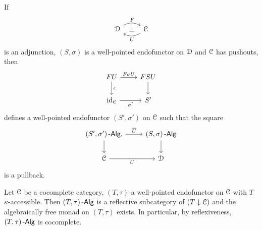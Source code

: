 \documentclass[a4paper,11pt,oneside,openany]{scrbook}
\begin{document}
\begin{prop}
	If
	\begin{displaymath}
		\begin{tikzcd}
			\D \arrow[r, "F", shift left=.1em, bend left=30]
			\arrow[from=r, "U", shift left=.1em, bend left=30]
			\arrow[r, phantom, "\bot"]
			& \C
		\end{tikzcd}
	\end{displaymath}
	is an adjunction, $ (S,\sigma) $ is a well-pointed endofunctor on $ \operatorname{\mathcal{D}} $
	and $ \operatorname{\mathcal{C}} $ has pushouts, then
	\begin{displaymath}
		\begin{tikzcd}
			FU \arrow[r,"F\sigma U"]\arrow[d, "\epsilon"]& FSU \arrow[d]\\
			\id_{\C} \arrow[r, "\sigma'"']& S'
		\end{tikzcd}
	\end{displaymath}
	defines a well-pointed endofunctor $ (S',\sigma') $ on $ \operatorname{\mathcal{C}} $ such that the square
	\begin{displaymath}
		\begin{tikzcd}
			(S',\sigma')\Alg \arrow[r, "\overline U"],\arrow[d]
			& (S,\sigma)\Alg \arrow[d]\\
			\C \arrow[r, "U"'] & \D
		\end{tikzcd}
	\end{displaymath}
	is a pullback.\hfill\qedsymbol
\end{prop}
\begin{thm}
	Let $ \operatorname{\mathcal{C}} $ be a cocomplete category, $ (T,\tau) $ a well-pointed endofunctor on $
    \operatorname{\mathcal{C}} $ with $ T $ $ \kappa $-accessible.
	Then $ (T,\tau)\operatorname{-\mathsf{Alg}} $ is a reflective subcategory of $ (T\downarrow\operatorname{\mathcal{C}})$ and
    the algebraically free monad on $ (T,\tau) $ exists. In particular, by
    reflexiveness, $ (T,\tau)\operatorname{-\mathsf{Alg}} $ is cocomplete.
\end{thm}
\end{document}
